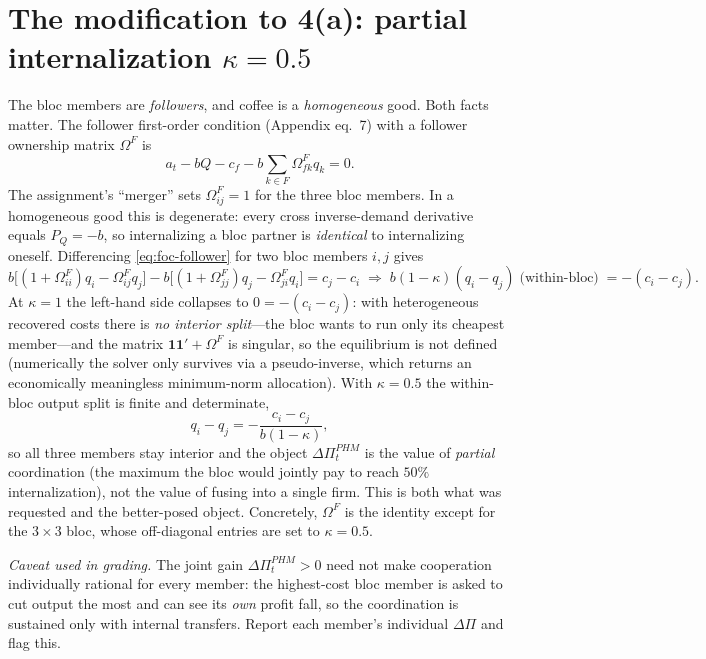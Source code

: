 \documentclass[11pt]{article}
\newcommand{\1}{\mathbf{1}}
\newcommand{\Om}{\Omega}
\newcommand{\OmF}{\Om^{F}}
\begin{document}
\section*{The modification to 4(a): partial internalization $\kappa=0.5$}
The bloc members are \emph{followers}, and coffee is a \emph{homogeneous} good.
Both facts matter. The follower first-order condition (Appendix eq.~7) with a
follower ownership matrix $\OmF$ is
\begin{equation}
a_t-bQ-c_f-b\sum_{k\in F}\OmF_{fk}q_k=0 .
\label{eq:foc-follower}
\end{equation}
The assignment's ``merger'' sets $\OmF_{ij}=1$ for the three bloc members. In a
homogeneous good this is degenerate: every cross inverse-demand derivative equals
$P_Q=-b$, so internalizing a bloc partner is \emph{identical} to internalizing
oneself. Differencing \eqref{eq:foc-follower} for two bloc members $i,j$ gives
\[
b\big[(1+\OmF_{ii})q_i-\OmF_{ij}q_j\big]-b\big[(1+\OmF_{jj})q_j-\OmF_{ji}q_i\big]
= c_j-c_i
\;\Longrightarrow\;
b(1-\kappa)(q_i-q_j) \;\text{(within-bloc)}\; = -(c_i-c_j).
\]
At $\kappa=1$ the left-hand side collapses to $0=-(c_i-c_j)$: with heterogeneous
recovered costs there is \emph{no interior split}---the bloc wants to run only its
cheapest member---and the matrix $\1\1'+\OmF$ is singular, so the equilibrium is
not defined (numerically the solver only survives via a pseudo-inverse, which
returns an economically meaningless minimum-norm allocation). With
$\kappa=0.5$ the within-bloc output split is finite and determinate,
\[
q_i-q_j=-\frac{c_i-c_j}{b(1-\kappa)},
\]
so all three members stay interior and the object $\Delta\Pi^{PHM}_t$ is the value
of \emph{partial} coordination (the maximum the bloc would jointly pay to reach
$50\%$ internalization), not the value of fusing into a single firm. This is both
what was requested and the better-posed object. Concretely, $\OmF$ is the identity
except for the $3\times3$ bloc, whose off-diagonal entries are set to $\kappa=0.5$.

\medskip\noindent\textit{Caveat used in grading.} The joint gain
$\Delta\Pi^{PHM}_t>0$ need not make cooperation individually rational for every
member: the highest-cost bloc member is asked to cut output the most and can see
its \emph{own} profit fall, so the coordination is sustained only with internal
transfers. Report each member's individual $\Delta\Pi$ and flag this.

\end{document}
